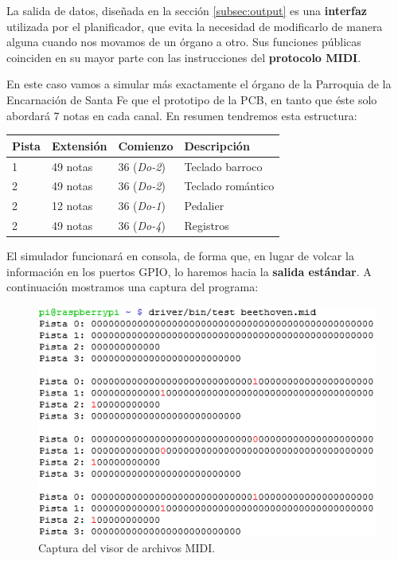 La salida de datos, diseñada en la sección \ref{subsec:output} es una \textbf{interfaz} utilizada por el planificador, que evita la necesidad de modificarlo de manera alguna cuando nos movamos de un órgano a otro. Sus funciones públicas coinciden en su mayor parte con las instrucciones del \textbf{protocolo \acrshort{MIDI}}.

En este caso vamos a simular más exactamente el órgano de la Parroquia de la Encarnación de Santa Fe que el prototipo de la \acrshort{PCB}, en tanto que éste solo abordará 7 notas en cada canal. En resumen tendremos esta estructura:

\smallskip

\begin{center}
	\begin{tabular}{|l|l|l|l|}
		\hline \textbf{Pista} & \textbf{Extensión} & \textbf{Comienzo} & \textbf{Descripción} \\ 
		\hline 1 & 49 notas & 36 (\textit{Do-2}) & Teclado barroco \\
		\hline 2 & 49 notas & 36 (\textit{Do-2}) & Teclado romántico \\
		\hline 2 & 12 notas & 36 (\textit{Do-1}) & Pedalier \\
		\hline 2 & 49 notas & 36 (\textit{Do-4}) & Registros \\
		\hline 
	\end{tabular}
	\smallskip
\end{center}

\smallskip

El simulador funcionará en consola, de forma que, en lugar de volcar la información en los puertos \acrshort{GPIO}, lo haremos hacia la \textbf{salida estándar}. A continuación mostramos una captura del programa:

\smallskip

\begin{figure}[H]
	\noindent \begin{centering}
		\includegraphics[width=\linewidth*3/4]{capitulo5/cap_miditest}
		\par\end{centering}
	\smallskip
	\caption{\label{fig:cap_miditest} Captura del visor de archivos MIDI.}
\end{figure} 

